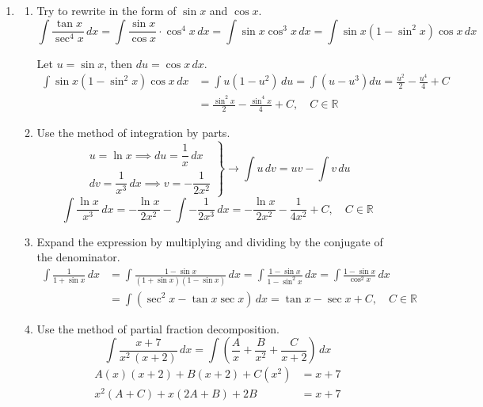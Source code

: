 \documentclass[a4paper, 12pt]{article}
\begin{document}
\begin{enumerate}[leftmargin=*,label=\textbf{\arabic*.}]
\begin{center}
\end{center}

\item \begin{enumerate}[leftmargin=*,label=\textbf{\alph*.}]
\item Try to rewrite in the form of $\sin x$ and $\cos x$.
\[\int\frac{\tan x}{\sec^4x}\,dx=\int\frac{\sin x}{\cos x}\cdot\cos^4x\,dx=\int\sin x\cos^3x\,dx=\int\sin x\left(1-\sin^2x\right)\cos x\,dx\]

Let $u=\sin x$, then $du=\cos x\,dx$.
\begin{align*}\int\sin x\left(1-\sin^2x\right)\cos x\,dx&=\int u\left(1-u^2\right)\,du=\int\left(u-u^3\right)du=\frac{u^2}2-\frac{u^4}4+C\\[1em]&=\boxed{\frac{\sin^2x}2-\frac{\sin^4x}{4}+C,\quad C\in\mathbb{R}}\end{align*}

\item Use the method of integration by parts.
\[\left.\begin{array}{c}
u=\ln x\implies du=\dfrac1x\,dx\\[1em]
dv=\dfrac1{x^3}\,dx\implies v=-\dfrac1{2x^2}
\end{array}\right\}\rightarrow \int u\,dv=uv-\int v\,du\]
\[\int\frac{\ln x}{x^3}\,dx=-\frac{\ln x}{2x^2}-\int-\frac1{2x^3}\,dx=\boxed{-\frac{\ln x}{2x^2}-\frac1{4x^2}+C,\quad C\in\mathbb{R}}\]

\item Expand the expression by multiplying and dividing by the conjugate of the denominator.
\begin{align*}\int\frac1{1+\sin x}\,dx&=\int\frac{1-\sin x}{(1+\sin x)(1-\sin x)}\,dx=\int\frac{1-\sin x}{1-\sin^2x}\,dx=\int\frac{1-\sin x}{\cos^2x}\,dx\\[1em]&=\int\left(\sec^2x-\tan x\sec x\right)\,dx=\boxed{\tan x-\sec x+C,\quad C\in\mathbb{R}}\end{align*}

\item Use the method of partial fraction decomposition.
\[\int\frac{x+7}{x^2\,(x+2)}\,dx=\int\left(\frac{A}{x}+\frac{B}{x^2}+\frac{C}{x+2}\right)\,dx\]
\[\begin{array}{rc}
A(x)(x+2)+B(x+2)+C\left(x^2\right)&=x+7\\
x^2(A+C)+x(2A+B)+2B&=x+7
\end{array}\]


\end{enumerate}
\end{enumerate}
\end{document}

